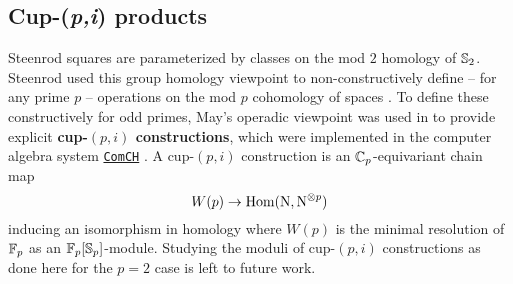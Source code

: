 \subsection{Cup-(\textit{p,i}) products}

Steenrod squares are parameterized by classes on the mod $2$ homology of $\mathbb{S}_2$.
Steenrod used this group homology viewpoint to non-constructively define -- for any prime $p$ -- operations on the mod $p$ cohomology of spaces \cite{steenrod1952reduced, steenrod1953cyclic}.
To define these constructively for odd primes, May's operadic viewpoint \cite{may1970general} was used in \cite{medina2021may_st} to provide explicit \textbf{cup-$(p,i)$ constructions}, which were implemented in the computer algebra system \href{https://github.com/ammedmar/comch}{\texttt{ComCH}} \cite{medina2021comch}.
A \mbox{cup-$(p,i)$} construction is an $\mathbb{C}_p$-equivariant chain map
\[
W(p) \to \mathrm{Hom}(\operatorname{N}, \operatorname{N}^{\otimes p})
\]
inducing an isomorphism in homology where $W(p)$
is the minimal resolution of ${\mathbb{F}_p}$ as an ${\mathbb{F}_p}[\mathbb{S}_p]$-module.
Studying the moduli of cup-$(p,i)$ constructions as done here for the $p = 2$ case is left to future work.
